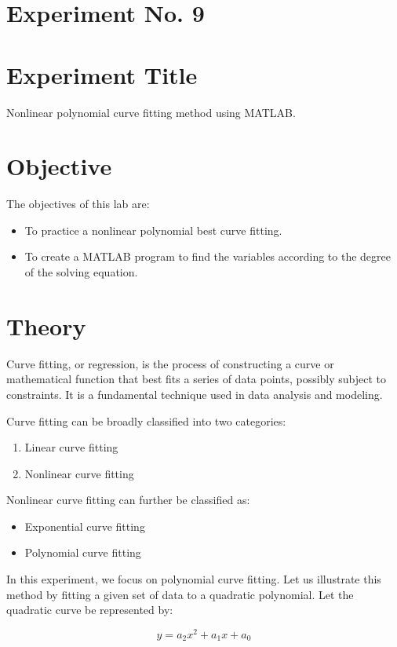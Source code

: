 \documentclass[a4paper,12pt]{article}
\begin{document}
	\section{Experiment No. 9}
	
	\section{Experiment Title }
Nonlinear polynomial curve fitting method using MATLAB.
	\section{Objective}
	
	The objectives of this lab are:
	\begin{itemize}
		\item To practice a nonlinear polynomial best curve fitting.
		\item To create a MATLAB program to find the variables according to the degree of the solving equation.
		
	\end{itemize}
	\section{Theory}
	
	Curve fitting, or regression, is the process of constructing a curve or mathematical function that best fits a series of data points, possibly subject to constraints. It is a fundamental technique used in data analysis and modeling.
	
	Curve fitting can be broadly classified into two categories:
	\begin{enumerate}
		\item Linear curve fitting
		\item Nonlinear curve fitting
	\end{enumerate}
	
	Nonlinear curve fitting can further be classified as:
	\begin{itemize}
		\item Exponential curve fitting
		\item Polynomial curve fitting
	\end{itemize}
	
	In this experiment, we focus on polynomial curve fitting. Let us illustrate this method by fitting a given set of data to a quadratic polynomial. Let the quadratic curve be represented by:
	
	\begin{equation}
		y = a_2x^2 + a_1x + a_0 \tag{9.1}
	\end{equation}
	
\end{document}
